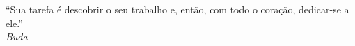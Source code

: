 \begin{titlepage}
 \vspace*{5cm}
 \begin{flushright}
  ``Sua tarefa é descobrir o seu trabalho e, 
  então, com todo o coração, dedicar-se a ele.''\\\textit{Buda}
  \vspace{1cm}
 \end{flushright}
\end{titlepage}
